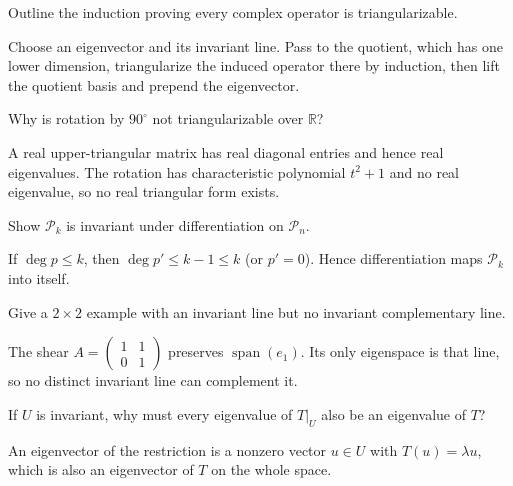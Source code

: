 \begin{problem}\label{prob:i10-problem-05}
Outline the induction proving every complex operator is triangularizable.
\end{problem}
\begin{solution}
Choose an eigenvector and its invariant line. Pass to the quotient, which has one lower dimension, triangularize the induced operator there by induction, then lift the quotient basis and prepend the eigenvector.
\end{solution}

\begin{problem}\label{prob:i10-problem-06}
Why is rotation by $90^\circ$ not triangularizable over $\mathbb R$?
\end{problem}
\begin{solution}
A real upper-triangular matrix has real diagonal entries and hence real eigenvalues. The rotation has characteristic polynomial $t^2+1$ and no real eigenvalue, so no real triangular form exists.
\end{solution}

\begin{problem}\label{prob:i10-problem-07}
Show $\mathcal P_k$ is invariant under differentiation on $\mathcal P_n$.
\end{problem}
\begin{solution}
If $\deg p\le k$, then $\deg p'\le k-1\le k$ (or $p'=0$). Hence differentiation maps $\mathcal P_k$ into itself.
\end{solution}

\begin{problem}\label{prob:i10-problem-08}
Give a $2\times2$ example with an invariant line but no invariant complementary line.
\end{problem}
\begin{solution}
The shear $A=\begin{pmatrix}1&1\\0&1\end{pmatrix}$ preserves $\operatorname{span}(e_1)$. Its only eigenspace is that line, so no distinct invariant line can complement it.
\end{solution}

\begin{problem}\label{prob:i10-problem-09}
If $U$ is invariant, why must every eigenvalue of $T|_U$ also be an eigenvalue of $T$?
\end{problem}
\begin{solution}
An eigenvector of the restriction is a nonzero vector $u\in U$ with $T(u)=\lambda u$, which is also an eigenvector of $T$ on the whole space.
\end{solution}

